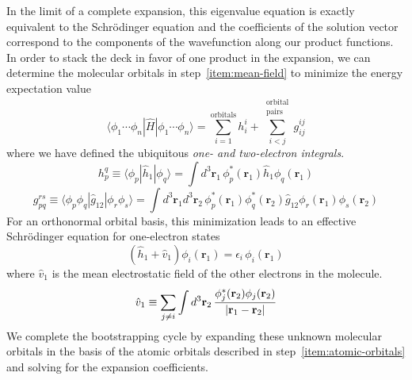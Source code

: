In the limit of a complete expansion, this eigenvalue equation is exactly
equivalent to the Schr\"odinger equation and the coefficients of the solution
vector correspond to the components of the wavefunction along our product
functions.
In order to stack the deck in favor of one product in the expansion, we can
determine the molecular orbitals in step~\ref{item:mean-field} to minimize the
energy expectation value
\begin{equation}
    \label{eq:introduction:orbital-product-expectation-value}
    \langle \phi_1\cdots \phi_n|
    \hat{H}
    |\phi_1\cdots \phi_n \rangle
    =
    \sum_{i=1}^\mathrm{orbitals}
    h_i^i
    +
    \sum_{i<j}^{\substack{\mathrm{orbital}\\\mathrm{pairs}}}
    g_{ij}^{ij}
\end{equation}
where we have defined the ubiquitous {\itshape one- and two-electron integrals}.
\begin{equation}
    h_p^q
    \equiv
    \langle\phi_p|\hat{h}_1|\phi_q\rangle
    =
    \int
    d^3\mathbf{r}_1\,
    \phi_p^*(\mathbf{r}_1)
    \hat{h}_1
    \phi_q(\mathbf{r}_1)
\end{equation}
\begin{equation}
    g_{pq}^{rs}
    \equiv
    \langle\phi_p\phi_q|\hat{g}_{12}|\phi_r\phi_s\rangle
    =
    \int
    d^3\mathbf{r}_1
    d^3\mathbf{r}_2\,
    \phi_p^*(\mathbf{r}_1)
    \phi_q^*(\mathbf{r}_2)
    \hat{g}_{12}
    \phi_r(\mathbf{r}_1)
    \phi_s(\mathbf{r}_2)
\end{equation}
For an orthonormal orbital basis, this minimization leads to an effective
Schr\"odinger equation for one-electron states
\begin{equation}
    \label{eq:introduction:mean-field-orbitals}
    (
        \hat{h}_1
        +
        \hat{v}_1
    )
    \phi_i(\mathbf{r}_1)
    =
    \epsilon_i\,
    \phi_i(\mathbf{r}_1)
\end{equation}
where \(\hat{v}_1\) is the mean electrostatic field of the other electrons in
the molecule.
\begin{equation}
    \hat{v}_1
    \equiv
    \sum_{j\neq i}
    \int
    d^3\mathbf{r}_2\,
    \frac{%
        \phi_j^*(\mathbf{r}_2)\phi_j(\mathbf{r}_2)
    }{%
        |\mathbf{r}_1 - \mathbf{r}_2|
    }
\end{equation}
We complete the bootstrapping cycle by expanding these unknown molecular
orbitals in the basis of the atomic orbitals described in
step~\ref{item:atomic-orbitals} and solving for the expansion coefficients.

